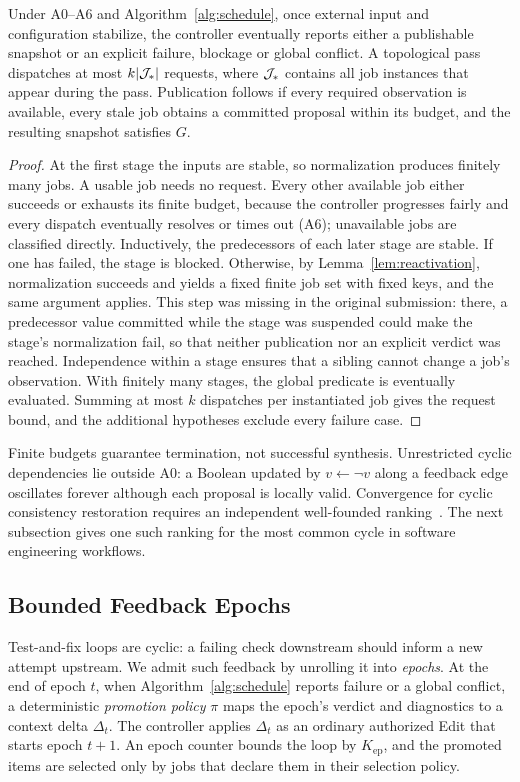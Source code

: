 \begin{theorem}\label{thm:termination}
Under A0--A6 and Algorithm~\ref{alg:schedule}, once external input and configuration stabilize, the controller eventually reports either a publishable snapshot or an explicit failure, blockage or global conflict. A topological pass dispatches at most $k|\mathcal J_*|$ requests, where $\mathcal J_*$ contains all job instances that appear during the pass. Publication follows if every required observation is available, every stale job obtains a committed proposal within its budget, and the resulting snapshot satisfies $G$.
\end{theorem}
\begin{proof}
At the first stage the inputs are stable, so normalization produces finitely many jobs. A usable job needs no request. Every other available job either succeeds or exhausts its finite budget, because the controller progresses fairly and every dispatch eventually resolves or times out (A6); unavailable jobs are classified directly. Inductively, the predecessors of each later stage are stable. If one has failed, the stage is blocked. Otherwise, by Lemma~\ref{lem:reactivation}, normalization succeeds and yields a fixed finite job set with fixed keys, and the same argument applies. This step was missing in the original submission: there, a predecessor value committed while the stage was suspended could make the stage's normalization fail, so that neither publication nor an explicit verdict was reached. Independence within a stage ensures that a sibling cannot change a job's observation. With finitely many stages, the global predicate is eventually evaluated. Summing at most $k$ dispatches per instantiated job gives the request bound, and the additional hypotheses exclude every failure case.
\end{proof}

Finite budgets guarantee termination, not successful synthesis. Unrestricted cyclic dependencies lie outside A0: a Boolean updated by $v\gets\neg v$ along a feedback edge oscillates forever although each proposal is locally valid. Convergence for cyclic consistency restoration requires an independent well-founded ranking~\cite{klare,stevens}. The next subsection gives one such ranking for the most common cycle in software engineering workflows.

\subsection{Bounded Feedback Epochs}\label{sec:epochs}
Test-and-fix loops are cyclic: a failing check downstream should inform a new attempt upstream. We admit such feedback by unrolling it into \emph{epochs}. At the end of epoch $t$, when Algorithm~\ref{alg:schedule} reports failure or a global conflict, a deterministic \emph{promotion policy} $\pi$ maps the epoch's verdict and diagnostics to a context delta $\Delta_t$. The controller applies $\Delta_t$ as an ordinary authorized Edit that starts epoch $t+1$. An epoch counter bounds the loop by $K_{\mathrm{ep}}$, and the promoted items are selected only by jobs that declare them in their selection policy.

